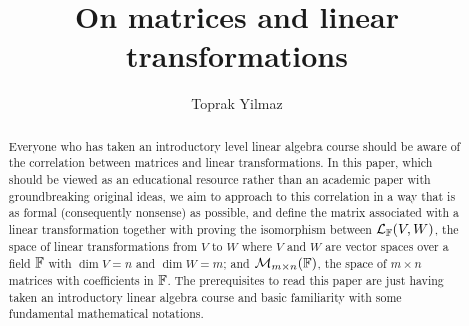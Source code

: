 \documentclass[12pt]{amsart}
\theoremstyle{definition}
\begin{document}
    \title{On matrices and linear transformations}
    \author{Toprak Yilmaz}
    \address{First-year Undergraduate, Department of Mathematics,
    Yıldız Technical University, Istanbul, Turkey}

    \begin{abstract}
        Everyone who has taken an introductory level linear algebra course should
        be aware of the correlation between matrices and linear transformations.
        In this paper, which should be viewed as an educational resource rather
        than an academic paper with groundbreaking original ideas, we aim to
        approach to this correlation in a way that is as formal (consequently
        nonsense) as possible, and define the matrix associated with a linear
        transformation together with proving the isomorphism between
        $\mathcal{L}_{\mathbb{F}}(V, W)$, the space of linear transformations from $V$ to $W$
        where $V$ and $W$ are vector spaces over a field $\mathbb{F}$ with $\dim{V} = n$
        and $\dim{W} = m$; and $\mathcal{M}_{m \times n}(\mathbb{F})$, the space of $m \times n$ matrices
        with coefficients in $\mathbb{F}$. The prerequisites to read this paper are just
        having taken an introductory linear algebra course and basic familiarity
        with some fundamental mathematical notations.
    \end{abstract}

    \maketitle
    \tableofcontents

    
    
    

    
    
    \nocite{*}
\end{document}
